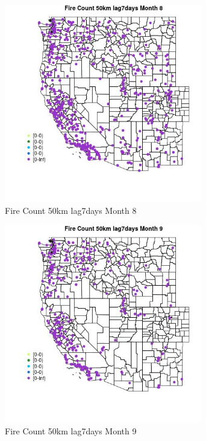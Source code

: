 \begin{figure} 
\centering  
\includegraphics[width=0.77\textwidth]{Code_Outputs/Report_ML_input_PM25_Step4_part_e_de_duplicated_aves_compiled_2019-05-18wNAs_MapObsMo8Fire_Count_50km_lag7days.jpg} 
\caption{\label{fig:Report_ML_input_PM25_Step4_part_e_de_duplicated_aves_compiled_2019-05-18wNAsMapObsMo8Fire_Count_50km_lag7days}Fire Count 50km lag7days Month 8} 
\end{figure} 
 

\begin{figure} 
\centering  
\includegraphics[width=0.77\textwidth]{Code_Outputs/Report_ML_input_PM25_Step4_part_e_de_duplicated_aves_compiled_2019-05-18wNAs_MapObsMo9Fire_Count_50km_lag7days.jpg} 
\caption{\label{fig:Report_ML_input_PM25_Step4_part_e_de_duplicated_aves_compiled_2019-05-18wNAsMapObsMo9Fire_Count_50km_lag7days}Fire Count 50km lag7days Month 9} 
\end{figure} 
 

